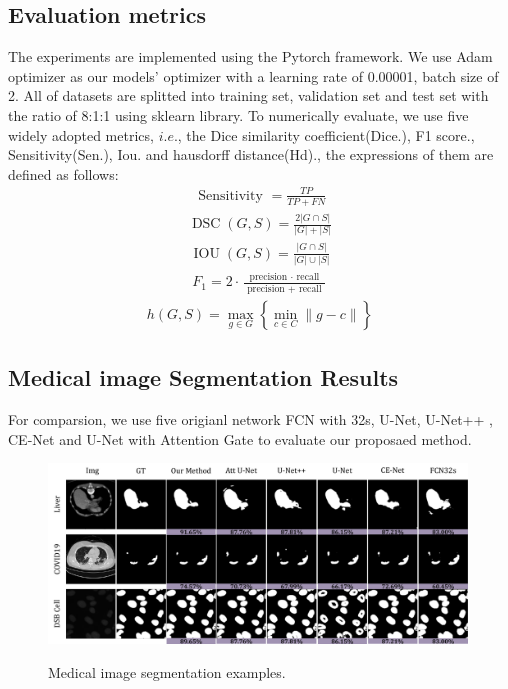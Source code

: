\documentclass{ieeeaccess}
\begin{document}
\subsection{Evaluation metrics}
The experiments are implemented using the Pytorch framework. We use Adam optimizer\cite{Adam} as our
models' optimizer with a learning rate of 0.00001, batch size of 2. All of datasets are splitted into training set, validation set and test set with 
the ratio of 8:1:1 using sklearn library. To numerically evaluate, we use five widely adopted metrics, \(i.e.\),
the Dice similarity coefficient(Dice.), F1 score., Sensitivity(Sen.), Iou. and hausdorff distance(Hd)., the expressions of them are defined as follows:
\begin{align}
  \text { Sensitivity }=\frac{T P}{T P+F N}
\end{align}
\begin{align}
  \operatorname{DSC}(G, S)=\frac{2|G \cap S|}{|G|+|S|}
\end{align}
\begin{align}
  \operatorname{IOU}(G, S)=\frac{|G \cap S|}{|G| \cup|S|}
\end{align}
\begin{align}
  F_{1}=2 \cdot \frac{\text { precision } \cdot \text { recall }}{\text { precision }+\text { recall }}
\end{align}
\begin{align}
  h(G, S)=\max _{g \in G}\left\{\min _{c \in C}\|g-c\|\right\}
\end{align}
\subsection{Medical image Segmentation Results}
For comparsion, we use five origianl network FCN with 32s\cite{fcn}, U-Net\cite{unet}, U-Net++\cite{unet++} , CE-Net\cite{cenet} and U-Net with Attention Gate\cite{attentiongate}
to evaluate our proposaed method. 
\begin{figure}[htbp]
  \begin{center}
  \includegraphics[width=0.99\textwidth]{figure/result.pdf}
  \vspace{-2mm}
  \caption{Medical image segmentation examples.} 
  \vspace{-2mm}
  \label{fig:result}
  \end{center}
  \vspace{-0.35cm}
\end{figure}
\end{document}
